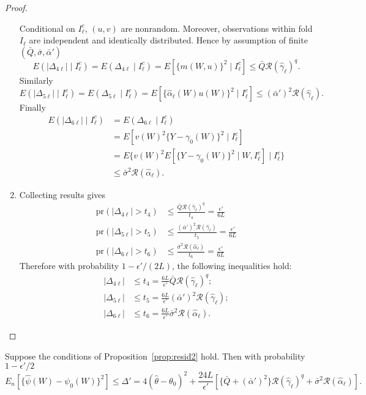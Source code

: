 \begin{proof}
\begin{enumerate}
     Conditional on $I_{\ell}^c$, $(u,v)$ are nonrandom. Moreover, observations within fold $I_{\ell}$ are independent and identically distributed. Hence by assumption of finite $(\bar{Q},\bar{\sigma},\bar{\alpha}')$
    $$
        E(|\Delta_{4\ell}|\mid I^c_{\ell})= E(\Delta_{4\ell}\mid I^c_{\ell})
        =E[\{m(W,u)\}^2\mid I^c_{\ell}]
        \leq  \bar{Q} \mathcal{R}(\hat{\gamma}_{\ell})^q.
   $$
   Similarly
    $$
       E(|\Delta_{5\ell}|\mid I^c_{\ell})= E(\Delta_{5\ell}\mid I^c_{\ell})
        =E[\{\hat{\alpha}_{\ell}(W)u(W)\}^2\mid I^c_{\ell}]
        \leq  (\bar{\alpha}')^2 \mathcal{R}(\hat{\gamma}_{\ell}).
   $$
    Finally 
    \begin{align*}
       E(|\Delta_{6\ell}|\mid I^c_{\ell})&=
       E(\Delta_{6\ell}\mid I^c_{\ell}) \\
        &=E[v(W)^2\{Y-\gamma_0(W)\}^2\mid I^c_{\ell}] \\
        &=E\{v(W)^2 E[\{Y-\gamma_0(W)\}^2\mid W,I^c_{\ell}]\mid I^c_{\ell}\} \\
        &\leq \bar{\sigma}^2 \mathcal{R}(\hat{\alpha}_{\ell}).
    \end{align*}
    \item Collecting results gives
     \begin{align*}
        \text{pr}(|\Delta_{4\ell}|>t_4)&\leq \frac{\bar{Q} \mathcal{R}(\hat{\gamma}_{\ell})^q}{t_4}=\frac{\epsilon'}{6L}\\
        \text{pr}(|\Delta_{5\ell}|>t_5)&\leq \frac{(\bar{\alpha}')^2 \mathcal{R}(\hat{\gamma}_{\ell})}{t_5}=\frac{\epsilon'}{6L} \\
        \text{pr}(|\Delta_{6\ell}|>t_6)&\leq \frac{\bar{\sigma}^2 \mathcal{R}(\hat{\alpha}_{\ell})}{t_6}=\frac{\epsilon'}{6L}
    \end{align*}
    Therefore with probability $1-\epsilon'/(2L)$, the following inequalities hold:
\begin{align*}
    |\Delta_{4\ell}|&\leq t_4=\frac{6L}{\epsilon'}\bar{Q} \mathcal{R}(\hat{\gamma}_{\ell})^q;\\
    |\Delta_{5\ell}|&\leq t_5=\frac{6L}{\epsilon'}(\bar{\alpha}')^2 \mathcal{R}(\hat{\gamma}_{\ell});\\
    |\Delta_{6\ell}|&\leq t_6=\frac{6L}{\epsilon'}\bar{\sigma}^2 \mathcal{R}(\hat{\alpha}_{\ell}).
\end{align*}
\end{enumerate}
\end{proof}

\begin{proposition}\label{prop:Delta2}
Suppose the conditions of Proposition~\ref{prop:resid2} hold. Then with probability $1-\epsilon'/2$
$$
E_n[\{\hat{\psi}(W)-\psi_0(W)\}^2]\leq \Delta'=4(\hat{\theta}-\theta_0)^2+\frac{24 L}{\epsilon'}\left[\{\bar{Q}+(\bar{\alpha}')^2\}\mathcal{R}(\hat{\gamma}_{\ell})^q+\bar{\sigma}^2\mathcal{R}(\hat{\alpha}_{\ell})\right].
$$
\end{proposition}

